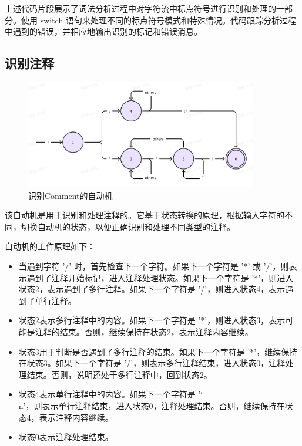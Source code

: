 \documentclass[lang=cn,11pt,a4paper]{elegantpaper}
\begin{document}
上述代码片段展示了词法分析过程中对字符流中标点符号进行识别和处理的一部分。使用 switch 语句来处理不同的标点符号模式和特殊情况。代码跟踪分析过程中遇到的错误，并相应地输出识别的标记和错误消息。

\subsection{识别注释}

\begin{figure}[!htb]
    \centering
    \includegraphics[width=0.9\textwidth]{image/Comment.png}
    \caption{识别Comment的自动机}
\end{figure}

该自动机是用于识别和处理注释的。它基于状态转换的原理，根据输入字符的不同，切换自动机的状态，以便正确识别和处理不同类型的注释。

自动机的工作原理如下：
\begin{itemize}
    \item 当遇到字符 '/' 时，首先检查下一个字符。如果下一个字符是 '*' 或 '/'，则表示遇到了注释开始标记，进入注释处理状态。如果下一个字符是 '*'，则进入状态2，表示遇到了多行注释。如果下一个字符是 '/'，则进入状态4，表示遇到了单行注释。
    \item 状态2表示多行注释中的内容。如果下一个字符是 '*'，则进入状态3，表示可能是注释的结束。否则，继续保持在状态2，表示注释内容继续。
    \item 状态3用于判断是否遇到了多行注释的结束。如果下一个字符是 '*'，继续保持在状态3。如果下一个字符是 '/'，则表示多行注释结束，进入状态0，注释处理结束。否则，说明还处于多行注释中，回到状态2。
    \item 状态4表示单行注释中的内容。如果下一个字符是 '\char`\\n'，则表示单行注释结束，进入状态0，注释处理结束。否则，继续保持在状态4，表示注释内容继续。
    \item 状态0表示注释处理结束。
\end{itemize}
\end{document}
